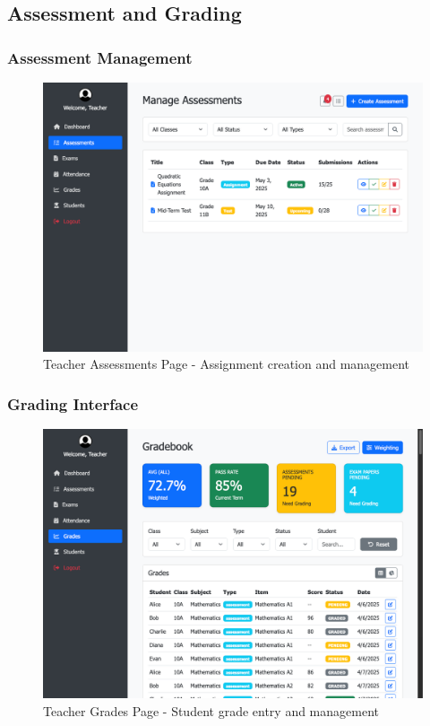 \documentclass[12pt,a4paper]{article}
\begin{document}
\subsection{Assessment and Grading}

\subsubsection{Assessment Management}
\begin{figure}[H]
    \centering
    \includegraphics[width=\textwidth]{teacher/teacher-assesements-page.png}
    \caption{Teacher Assessments Page - Assignment creation and management}
    \label{fig:teacher-assessments}
\end{figure}

\subsubsection{Grading Interface}
\begin{figure}[H]
    \centering
    \includegraphics[width=\textwidth]{teacher/teacher-grades-page.png}
    \caption{Teacher Grades Page - Student grade entry and management}
    \label{fig:teacher-grades}
\end{figure}
\end{document}
